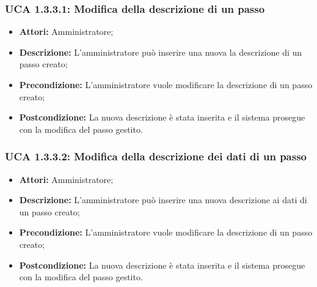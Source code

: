 \hypertarget{A1.3.3.1}{}
\subsubsection{UCA 1.3.3.1: Modifica della descrizione di un passo}
\begin{itemize}
\item \textbf{Attori:}
Amministratore;
\item \textbf{Descrizione:}
L'amministratore può inserire una nuova la descrizione di un passo creato;
\item \textbf{Precondizione:}
L'amministratore vuole modificare la descrizione di un passo creato;
\item \textbf{Postcondizione:}
La nuova descrizione è stata inserita e il sistema prosegue con la modifica del passo gestito.
\end{itemize}

\hypertarget{A1.3.3.2}{}
\subsubsection{UCA 1.3.3.2: Modifica della descrizione dei dati di un passo}
\begin{itemize}
\item \textbf{Attori:}
Amministratore;
\item \textbf{Descrizione:}
L'amministratore può inserire una nuova descrizione ai dati di un passo creato;
\item \textbf{Precondizione:}
L'amministratore vuole modificare la descrizione di un passo creato;
\item \textbf{Postcondizione:}
La nuova descrizione è stata inserita e il sistema prosegue con la modifica del passo gestito.
\end{itemize}

\hypertarget{A1.3.3.3}{}
